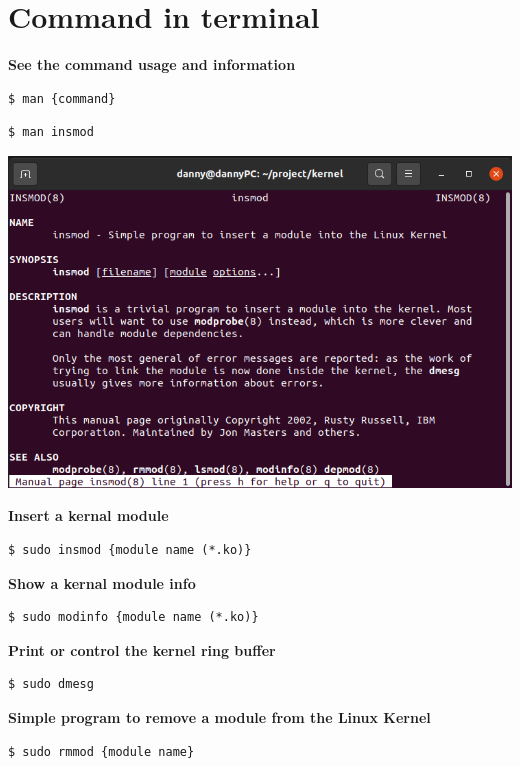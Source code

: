 \section{Command in terminal}

\textbf{See the command usage and information}
\begin{lstlisting}[style=bashStyle]
    $ man {command}
\end{lstlisting}
\begin{lstlisting}[style=bashStyle]
    $ man insmod
\end{lstlisting}
\begin{center}
    \includegraphics[width=\linewidth]{images/man_insmod.png}
\end{center}

\textbf{Insert a kernal module}
\begin{lstlisting}[style=bashStyle]
    $ sudo insmod {module name (*.ko)}
\end{lstlisting}

\textbf{Show a kernal module info}
\begin{lstlisting}[style=bashStyle]
    $ sudo modinfo {module name (*.ko)}
\end{lstlisting}

\textbf{Print or control the kernel ring buffer}
\begin{lstlisting}[style=bashStyle]
    $ sudo dmesg
\end{lstlisting}

\textbf{Simple program to remove a module from the Linux Kernel}
\begin{lstlisting}[style=bashStyle]
    $ sudo rmmod {module name}
\end{lstlisting}











